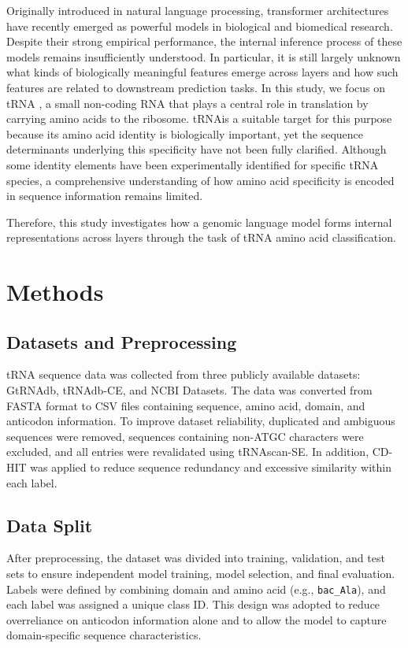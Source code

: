 \documentclass[a4paper,11pt,draft]{jsarticle}
\begin{document}
Originally introduced in natural language processing, transformer architectures have recently emerged as powerful models in biological and biomedical research\cite{madan2024transformer}.
Despite their strong empirical performance, the internal inference process of these models remains insufficiently understood. In particular, it is still largely unknown what kinds of biologically meaningful features emerge across layers and how such features are related to downstream prediction tasks.
In this study, we focus on tRNA , a small non-coding RNA that plays a central role in translation by carrying amino acids to the ribosome. tRNAis a suitable target for this purpose because its amino acid identity is biologically important, yet the sequence determinants underlying this specificity have not been fully clarified. Although some identity elements have been experimentally identified for specific \ac{tRNA} species, a comprehensive understanding of how amino acid specificity is encoded in sequence information remains limited.

Therefore, this study investigates how a genomic language model forms internal representations across layers through the task of tRNA amino acid classification.

\section{Methods}
\subsection{Datasets and Preprocessing}

tRNA sequence data was collected from three publicly available datasets: GtRNAdb\cite{chan2016gtrnadb}, tRNAdb-CE\cite{abe2014trnadb}, and NCBI Datasets\cite{o2024exploring}. The data was converted from FASTA format to CSV files containing sequence, amino acid, domain, and anticodon information.
To improve dataset reliability, duplicated and ambiguous sequences were removed, sequences containing non-ATGC characters were excluded, and all entries were revalidated using tRNAscan-SE. In addition, CD-HIT\cite{fu2012cd} was applied to reduce sequence redundancy and excessive similarity within each label.

\subsection{Data Split}

After preprocessing, the dataset was divided into training, validation, and test sets to ensure independent model training, model selection, and final evaluation. Labels were defined by combining domain and amino acid (e.g., \texttt{bac\_Ala}), and each label was assigned a unique class ID. 
This design was adopted to reduce overreliance on anticodon information alone and to allow the model to capture domain-specific sequence characteristics.
\end{document}
